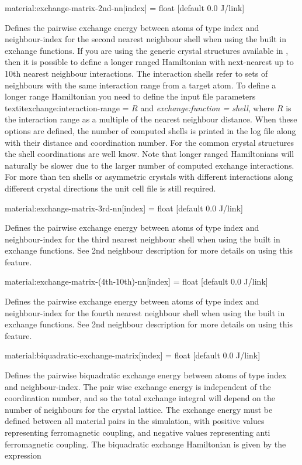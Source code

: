 {\zicf material:exchange-matrix-2nd-nn[index] = float [default 0.0 J/link]} Defines the pairwise exchange energy between atoms of type index and neighbour-index for the second nearest neighbour shell when using the built in exchange functions. If you are using the generic crystal structures available in \vampire, then it is possible to define a longer ranged Hamiltonian with next-nearest up to 10th nearest neighbour interactions. The interaction shells refer to sets of neighbours with the same interaction range from a target atom. To define a longer range Hamiltonian you need to define the input file parameters  textit{exchange:interaction-range = $R$} and \textit{exchange:function = shell}, where $R$ is the interaction range as a multiple of the nearest neighbour distance. When these options are defined, the number of computed shells is printed in the log file along with their distance and coordination number. For the common crystal structures the shell coordinations are well know. Note that longer ranged Hamiltonians will naturally be slower due to the larger number of computed exchange interactions. For more than ten shells or asymmetric crystals with different interactions
 along different crystal directions the unit cell file is still required.

{\zicf material:exchange-matrix-3rd-nn[index] = float [default 0.0 J/link]} Defines the pairwise exchange energy between atoms of type index and neighbour-index for the third nearest neighbour shell when using the built in exchange functions. See 2nd neighbour description for more details on using this feature.

{\zicf material:exchange-matrix-(4th-10th)-nn[index] = float [default 0.0 J/link]} Defines the pairwise exchange energy between atoms of type index and neighbour-index for the fourth nearest neighbour shell when using the built in exchange functions. See 2nd neighbour description for more details on using this feature.

{\zicf material:biquadratic-exchange-matrix[index] = float [default 0.0 J/link]} Defines the pairwise biquadratic exchange energy between atoms of type index and neighbour-index. The pair wise exchange energy is independent of the coordination number, and so the total exchange integral will depend on the number of neighbours for the crystal lattice. The exchange energy must be defined between all material pairs in the simulation, with positive values representing ferromagnetic coupling, and negative values representing anti ferromagnetic coupling. The biquadratic exchange Hamiltonian is given by the expression 

